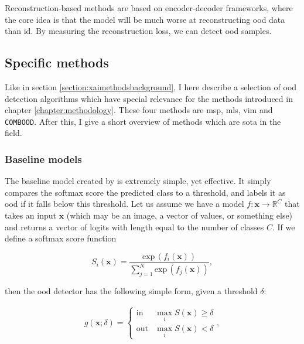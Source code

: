\documentclass[UKenglish]{uiomasterthesis} %
\newcommand{\R}{\mathbb{R}}
\theoremstyle{definition}
\begin{document}
Reconstruction-based methods are based on encoder-decoder frameworks, where the core idea is that the model will be much worse at reconstructing \ac{ood} data than \ac{id}. By measuring the reconstruction loss, we can detect \ac{ood} samples.
\\

\subsection{Specific methods} \label{ood_specific}

Like in section \ref{section:xaimethodsbackground}, I here describe a selection of \ac{ood} detection algorithms which have special relevance for the methods introduced in chapter \ref{chapter:methodology}. These four methods are \ac{msp}, \ac{mls}, \ac{vim} and \texttt{COMBOOD}. After this, I give a short overview of methods which are \ac{sota} in the field.

\subsubsection{Baseline models} \label{section:background_baselines}

The baseline model created by \cite{oodbaseline} is extremely simple, yet effective. It simply compares the softmax score the predicted class to a threshold, and labels it as \ac{ood} if it falls below this threshold. Let us assume we have a model $f: \bm{x} \rightarrow \R^C$ that takes an input $\bm{x}$ (which may be an image, a vector of values, or something else) and returns a vector of logits with length equal to the number of classes $C$. If we define a softmax score function 

\begin{equation}
    S_i(\bm{x}) = \frac{\text{exp} \, (f_i(\bm{x}))}{\sum^N_{j=1} \text{exp} \, (f_j(\bm{x}))},
\label{softmax}
\end{equation}

then the \ac{ood} detector has the following simple form, given a threshold $\delta$:

\begin{align}
\label{eq:msp}
    g(\bm{x}; \delta)=\begin{cases} 
        \text{in } & \max_i S(\bm{x})\ge \delta \\
        \text{out} & \max_i S(\bm{x}) < \delta 
   \end{cases},
\end{align}
\end{document}
